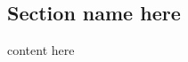 \documentclass[overlapped,line,letterpaper]{res}
\begin{document}

\setlength{\leftmargini}{0em}
\renewcommand{\labelitemi}{}

\renewcommand{\namefont}{\large\textbf}


\newcommand{\bME}{{\bf T. D. Mikesell}}




\begin{resume}

\section{\bf Section name here}

content here



\



\end{resume}
\end{document}
